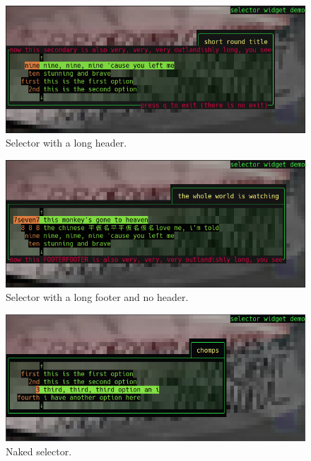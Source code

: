 \documentclass[letterpaper,10pt]{article}
\begin{document}
\begin{figure}
  \centering \includegraphics[width=.75\linewidth]{media/selector3.png}
    \caption{Selector with a long header.}
\end{figure}

\begin{figure}
\centering \includegraphics[width=.75\linewidth]{media/selector4.png}
\caption{Selector with a long footer and no header.}
\end{figure}

\begin{figure}
  \centering \includegraphics[width=.75\linewidth]{media/selector5.png}
  \caption{Naked selector.}
\end{figure}
\end{document}
